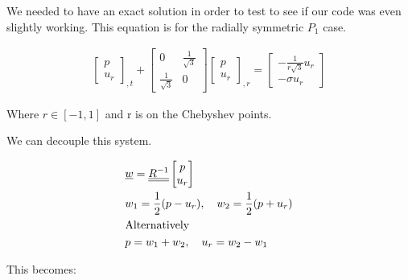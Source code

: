 
We needed to have an exact solution in order to test to see if our code was even slightly working. This equation is for the radially symmetric $P_1$ case. 

\begin{align*}
\begin{bmatrix}
p \\
u_r
\end{bmatrix} _{,t}
+
\begin{bmatrix}
0 & \frac{1}{\sqrt{3}} \\
\frac{1}{\sqrt{3}} & 0
\end{bmatrix}
\begin{bmatrix}
p \\
u_r
\end{bmatrix} _{,r}
=
\begin{bmatrix}
-\frac{1}{r\sqrt{3}} u_r \\
-\sigma u_r
\end{bmatrix}
\end{align*}

Where $r \in [-1, 1]$ and r is on the Chebyshev points. 

We can decouple this system.

\begin{align*}
&{\underline{w}} = {\underline{\underline{R^{-1}}}}
\begin{bmatrix}
p \\
u_r
\end{bmatrix} \\
&w_1 = \frac{1}{2}(p - u_r), \quad
w_2 = \frac{1}{2}(p + u_r) \\
&\text{Alternatively} \\
&p = w_1 + w_2, \quad
u_r = w_2 - w_1
\end{align*}

This becomes:

